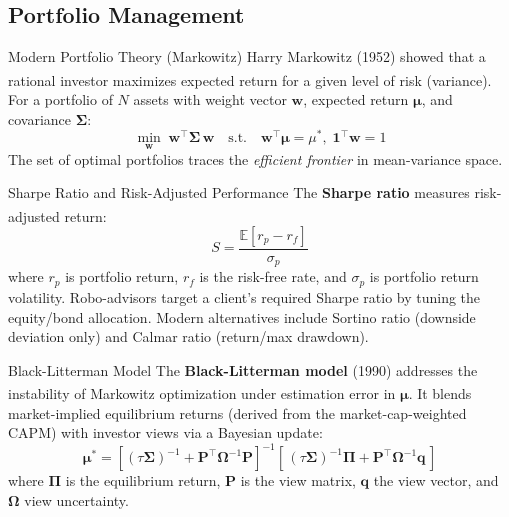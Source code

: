 \subsection{Portfolio Management}


\begin{v3topic}{Modern Portfolio Theory (Markowitz)}
    Harry Markowitz (1952) showed that a rational investor maximizes expected return for a given level of risk (variance)\textsuperscript{\cite[][p.~127]{jansenMachineLearningAlgorithmic2020}}.
    For a portfolio of $N$ assets with weight vector $\mathbf{w}$, expected return $\boldsymbol{\mu}$, and covariance $\boldsymbol{\Sigma}$:
    \begin{equation}
        \min_{\mathbf{w}}\; \mathbf{w}^\top \boldsymbol{\Sigma}\, \mathbf{w} \quad \text{s.t.} \quad \mathbf{w}^\top \boldsymbol{\mu} = \mu^*, \; \mathbf{1}^\top \mathbf{w} = 1
    \end{equation}
    The set of optimal portfolios traces the \emph{efficient frontier} in mean-variance space.

\end{v3topic}
\begin{v3topic}{Sharpe Ratio and Risk-Adjusted Performance}
    The \textbf{Sharpe ratio} measures risk-adjusted return\textsuperscript{\cite[][p.~122]{jansenMachineLearningAlgorithmic2020}}:
    \begin{equation}
        S = \frac{\mathbb{E}[r_p - r_f]}{\sigma_p}
    \end{equation}
    where $r_p$ is portfolio return, $r_f$ is the risk-free rate, and $\sigma_p$ is portfolio return volatility.
    Robo-advisors target a client's required Sharpe ratio by tuning the equity/bond allocation.
    Modern alternatives include Sortino ratio (downside deviation only) and Calmar ratio (return/max drawdown).

\end{v3topic}
\begin{v3topic}{Black-Litterman Model}
    The \textbf{Black-Litterman model} (1990) addresses the instability of Markowitz optimization under estimation error in $\boldsymbol{\mu}$\textsuperscript{\cite[][pp.~131--132]{jansenMachineLearningAlgorithmic2020}}.
    It blends market-implied equilibrium returns (derived from the market-cap-weighted CAPM) with investor views via a Bayesian update:
    \begin{equation}
        \boldsymbol{\mu}^* = [(\tau \boldsymbol{\Sigma})^{-1} + \mathbf{P}^\top \boldsymbol{\Omega}^{-1} \mathbf{P}]^{-1}[\,(\tau \boldsymbol{\Sigma})^{-1} \boldsymbol{\Pi} + \mathbf{P}^\top \boldsymbol{\Omega}^{-1} \mathbf{q}\,]
    \end{equation}
    where $\boldsymbol{\Pi}$ is the equilibrium return, $\mathbf{P}$ is the view matrix, $\mathbf{q}$ the view vector, and $\boldsymbol{\Omega}$ view uncertainty.

\end{v3topic}
